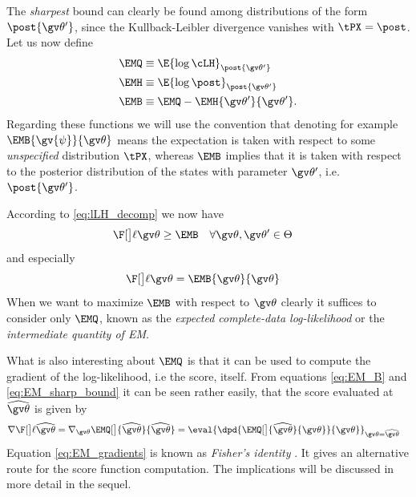 The \emph{sharpest} bound can clearly be found among
distributions of the form $\post{\Th'}$, since the Kullback-Leibler divergence 
vanishes with $\tPX= \post$.
Let us now define
\begin{align}
	\EMQ &\equiv \E{\log\cLH}_{\post{\Th'}} \label{eq:EM_Q}\\
	\EMH &\equiv \E{\log\post}_{\post{\Th'}} \label{eq:EM_H}\\
	\EMB &\equiv \EMQ - \EMH{\Th'}{\Th'} \label{eq:EM_B}.
\end{align}
Regarding these functions we will use the convention that denoting for example $\EMB{\gv{\psi}}{\Th}$ means the
expectation is taken with respect to some \emph{unspecified} distribution $\tPX$, whereas $\EMB$ implies
that it is taken with respect to the posterior distribution of the states with parameter $\Th'$, i.e. $\post{\Th'}$. 


According to \eqref{eq:lLH_decomp} we now have
\begin{align}
	\lLH & \geq \EMB \quad \forall \Th,\Th' \in \Theta
	\label{eq:EM_LB}
\end{align}
and especially
\begin{align}
	\lLH & = \EMB{\Th}{\Th}
	\label{eq:EM_sharp_bound}
\end{align}
When we want to maximize $\EMB$ with respect to $\Th$
clearly it suffices to consider
only $\EMQ$, known as the \emph{expected complete-data log-likelihood}
or the \emph{intermediate quantity of EM}.

What is also interesting about $\EMQ$ is that it can be used to compute the gradient of the log-likelihood, i.e
the score, itself. From equations \eqref{eq:EM_B}
and \eqref{eq:EM_sharp_bound} it can be seen rather easily, that  
the score evaluated at $\widehat{\Th}$ is given by
\begin{align}
		\score[\widehat\Th]&=
		\nabla_{\Th}\EMQ[\big]{\widehat\Th}{\widehat\Th}
		=\eval{\dpd{ \EMQ[\big]{\widehat\Th}{\Th}}{\Th}}_{\Th=\widehat\Th} \label{eq:EM_gradients}
\end{align} 
Equation \eqref{eq:EM_gradients} is known as \emph{Fisher's identity} \parencite{Cappe2005}. It gives
an alternative route for the score function computation.
The implications will be discussed in more detail in the sequel.

